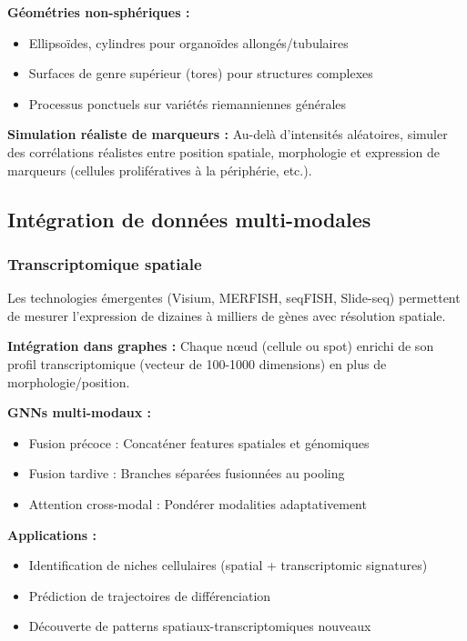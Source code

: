 \textbf{Géométries non-sphériques :}
\begin{itemize}
    \item Ellipsoïdes, cylindres pour organoïdes allongés/tubulaires
    \item Surfaces de genre supérieur (tores) pour structures complexes
    \item Processus ponctuels sur variétés riemanniennes générales
\end{itemize}

\textbf{Simulation réaliste de marqueurs :}
Au-delà d'intensités aléatoires, simuler des corrélations réalistes entre position spatiale, morphologie et expression de marqueurs (cellules prolifératives à la périphérie, etc.).

\subsection{Intégration de données multi-modales}

\subsubsection{Transcriptomique spatiale}

Les technologies émergentes (Visium, MERFISH, seqFISH, Slide-seq) permettent de mesurer l'expression de dizaines à milliers de gènes avec résolution spatiale.

\textbf{Intégration dans graphes :}
Chaque nœud (cellule ou spot) enrichi de son profil transcriptomique (vecteur de 100-1000 dimensions) en plus de morphologie/position.

\textbf{GNNs multi-modaux :}
\begin{itemize}
    \item Fusion précoce : Concaténer features spatiales et génomiques
    \item Fusion tardive : Branches séparées fusionnées au pooling
    \item Attention cross-modal : Pondérer modalities adaptativement
\end{itemize}

\textbf{Applications :}
\begin{itemize}
    \item Identification de niches cellulaires (spatial + transcriptomic signatures)
    \item Prédiction de trajectoires de différenciation
    \item Découverte de patterns spatiaux-transcriptomiques nouveaux
\end{itemize}

